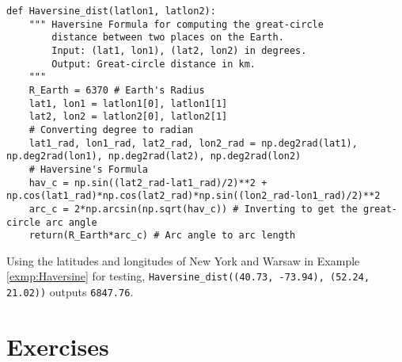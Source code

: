 \begin{lstlisting}
def Haversine_dist(latlon1, latlon2):
    """ Haversine Formula for computing the great-circle 
        distance between two places on the Earth. 
        Input: (lat1, lon1), (lat2, lon2) in degrees.
        Output: Great-circle distance in km.
    """
    R_Earth = 6370 # Earth's Radius
    lat1, lon1 = latlon1[0], latlon1[1]
    lat2, lon2 = latlon2[0], latlon2[1]
    # Converting degree to radian
    lat1_rad, lon1_rad, lat2_rad, lon2_rad = np.deg2rad(lat1), np.deg2rad(lon1), np.deg2rad(lat2), np.deg2rad(lon2) 
    # Haversine's Formula
    hav_c = np.sin((lat2_rad-lat1_rad)/2)**2 + np.cos(lat1_rad)*np.cos(lat2_rad)*np.sin((lon2_rad-lon1_rad)/2)**2 
    arc_c = 2*np.arcsin(np.sqrt(hav_c)) # Inverting to get the great-circle arc angle
    return(R_Earth*arc_c) # Arc angle to arc length
\end{lstlisting}
Using the latitudes and longitudes of New York and Warsaw in Example \ref{exmp:Haversine} for testing, \verb|Haversine_dist((40.73, -73.94), (52.24, 21.02))| outputs \texttt{6847.76}.

\section{Exercises}

